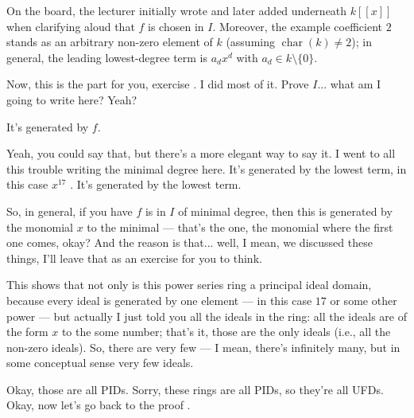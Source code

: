 \begin{proofWrapper}
\begin{aiNote}
On the board, the lecturer initially wrote  and later added  underneath $k[[x]]$ when clarifying aloud that $f$ is chosen in $I$. Moreover, the example coefficient $2$ stands as an arbitrary non-zero element of $k$ (assuming $\operatorname{char}(k) \neq 2$); in general, the leading lowest-degree term is $a_d x^d$ with $a_d \in k \setminus \{0\}$.
\end{aiNote}

\begin{speech}[00:05:31 - 00:05:44]
Now, this is the part for you, exercise . I did most of it. Prove $I$... what am I going to write here? Yeah?
\end{speech}

\begin{student}
It's generated by $f$.
\end{student}

\begin{speech}[00:05:46 - 00:06:56]
Yeah, you could say that, but there's a more elegant way to say it. I went to all this trouble writing the minimal degree here. It's generated by the lowest term, in this case $x^{17}$ . It's generated by the lowest term.

So, in general, if you have $f$ is in $I$ of minimal degree, then this is generated by the monomial $x$ to the minimal  --- that's the one, the monomial where the first one comes, okay? And the reason is that... well, I mean, we discussed these things, I'll leave that as an exercise for you to think.

This shows that not only is this power series ring a principal ideal domain, because every ideal is generated by one element --- in this case $17$ or some other power --- but actually I just told you all the ideals in the ring: all the ideals are of the form $x$ to the some number; that's it, those are the only ideals (i.e., all the non-zero ideals). So, there are very few --- I mean, there's infinitely many, but in some conceptual sense very few ideals.

Okay, those are all PIDs. Sorry, these rings are all PIDs, so they're all UFDs. Okay, now let's go back to the proof .
\end{speech}


\end{proofWrapper}

